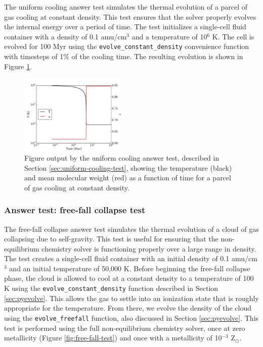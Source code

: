 The uniform cooling answer test simulates the thermal evolution of a
parcel of gas cooling at constant density.  This test ensures that the
solver properly evolves the internal energy over a period of time.
The test initializes a single-cell fluid container with a density of
0.1 amu/cm$^{3}$ and a temperature of 10$^{6}$ K.  The cell is evolved
for 100 Myr using the \texttt{evolve\_constant\_density} convenience
function with timesteps of 1\% of the cooling time.  The
resulting evolution is shown in Figure
\ref{fig:uniform-cooling-test}.

\begin{figure}
  \centering
  \includegraphics[width=0.45\textwidth]{cooling_cell.pdf}
  \caption{
    Figure output by the uniform cooling answer test, described in
    Section \ref{sec:uniform-cooling-test}, showing the temperature
    (black) and mean molecular weight (red) as a function of time for
    a parcel of gas cooling at constant density.
  } \label{fig:uniform-cooling-test}
\end{figure}

\subsubsection{Answer test: free-fall collapse test}
\label{sec:free-fall-test}

The free-fall collapse answer test simulates the thermal evolution of
a cloud of gas collapsing due to self-gravity.  This test is useful
for ensuring that the non-equilibrium chemistry solver is functioning
properly over a large range in density.  The test creates a
single-cell fluid container with an initial density of 0.1
amu/cm$^{3}$ and an initial temperature of
50,000 K.  Before beginning the free-fall collapse phase, the cloud is
allowed to cool at a constant density to a temperature of 100 K using
the \texttt{evolve\_constant\_density} function described in Section
\ref{sec:pyevolve}.  This allows the gas to settle into an ionization
state that is roughly appropriate for the temperature.  From there, we
evolve the density of the cloud using the \texttt{evolve\_freefall}
function, also discussed in Section \ref{sec:pyevolve}.  This test is
performed using the full non-equilibrium chemistry solver, once at
zero metallicity (Figure \ref{fig:free-fall-test}) and once with a
metallicity of 10$^{-3}$ Z$_{\odot}$.

